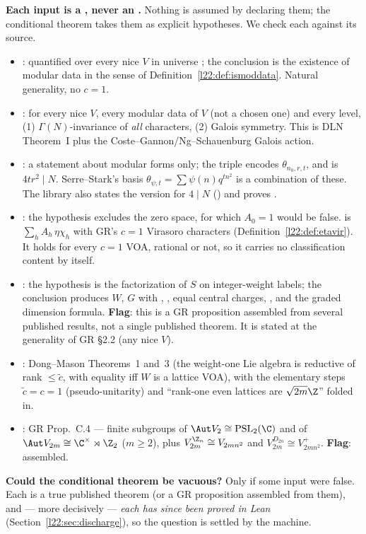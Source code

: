 \begin{dictionary}
\textbf{Each input is a , never an .} Nothing is assumed by declaring them; the
conditional theorem takes them as explicit hypotheses. We check each against its source.
\begin{itemize}
\item {}: quantified over every nice $V$ in universe ; the conclusion is the existence of
  modular data in the sense of Definition~\ref{l22:def:ismoddata}. Natural generality, no $c=1$.
\item {}: for every nice $V$, every modular data  of $V$ (not a chosen one) and
  every level, (1) $\Gamma(N)$-invariance of \emph{all} characters, (2) Galois symmetry. This is DLN Theorem~I plus
  the Coste--Gannon/Ng--Schauenburg Galois action.
\item {}: a statement about modular forms only; the triple  encodes
  $\theta_{n_0,r,t}$, and  is $4tr^2\mid N$. Serre--Stark's basis
  $\theta_{\psi,t}=\sum\psi(n)q^{tn^2}$ is a combination of these. The library also states the version for
  $4\mid N$ () and proves .
\item {}: the hypothesis  excludes the zero space, for which $A_0=1$ would be
  false.  is $\sum_hA_h\,\eta\chi_h$ with GR's $c=1$ Virasoro characters
  (Definition~\ref{l22:def:etavir}). It holds for every $c=1$ VOA, rational or not, so it carries no
  classification content by itself.
\item {}: the hypothesis is the factorization of $S$ on integer-weight labels; the conclusion
  produces $W$, $G$ with , , equal central charges, , and the graded
  dimension formula. \textbf{Flag}: this is a GR proposition assembled from several published results, not a single
  published theorem. It is stated at the generality of GR §2.2 (any nice $V$).
\item {}: Dong--Mason Theorems~1 and~3 (the weight-one Lie algebra is reductive of rank
  $\le\tilde c$, with equality iff $W$ is a lattice VOA), with the elementary steps $\tilde c=c=1$
  (pseudo-unitarity) and ``rank-one even lattices are $\sqrt{2m}\Z$'' folded in.
\item {}: GR Prop.~C.4 --- finite subgroups of $\Aut V_2\cong\mathrm{PSL}_2(\C)$ and of
  $\Aut V_{2m}\cong\C^\times\rtimes\Z_2$ ($m\ge2$), plus $V_{2m}^{\Z_n}\cong V_{2mn^2}$ and
  $V_{2m}^{D_{2n}}\cong V_{2mn^2}^+$. \textbf{Flag}: assembled.
\end{itemize}
\textbf{Could the conditional theorem be vacuous?} Only if some input were false. Each is a true published theorem
(or a GR proposition assembled from them), and --- more decisively --- \emph{each has since been proved in Lean}
(Section~\ref{l22:sec:discharge}), so the question is settled by the machine.
\end{dictionary}

